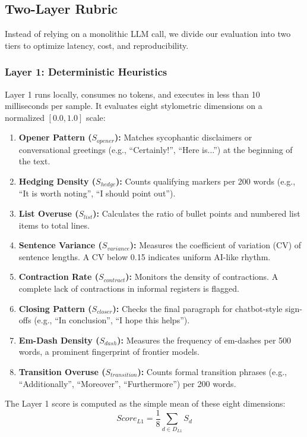 \documentclass{article}
\begin{document}
\subsection{Two-Layer Rubric}
Instead of relying on a monolithic LLM call, we divide our evaluation into two tiers to optimize latency, cost, and reproducibility.

\subsubsection{Layer 1: Deterministic Heuristics}
Layer 1 runs locally, consumes no tokens, and executes in less than 10 milliseconds per sample. It evaluates eight stylometric dimensions on a normalized $[0.0, 1.0]$ scale:
\begin{enumerate}
    \item \textbf{Opener Pattern ($S_{opener}$):} Matches sycophantic disclaimers or conversational greetings (e.g., ``Certainly!'', ``Here is...'') at the beginning of the text.
    \item \textbf{Hedging Density ($S_{hedge}$):} Counts qualifying markers per 200 words (e.g., ``It is worth noting'', ``I should point out'').
    \item \textbf{List Overuse ($S_{list}$):} Calculates the ratio of bullet points and numbered list items to total lines.
    \item \textbf{Sentence Variance ($S_{variance}$):} Measures the coefficient of variation (CV) of sentence lengths. A CV below 0.15 indicates uniform AI-like rhythm.
    \item \textbf{Contraction Rate ($S_{contract}$):} Monitors the density of contractions. A complete lack of contractions in informal registers is flagged.
    \item \textbf{Closing Pattern ($S_{closer}$):} Checks the final paragraph for chatbot-style sign-offs (e.g., ``In conclusion'', ``I hope this helps'').
    \item \textbf{Em-Dash Density ($S_{dash}$):} Measures the frequency of em-dashes per 500 words, a prominent fingerprint of frontier models.
    \item \textbf{Transition Overuse ($S_{transition}$):} Counts formal transition phrases (e.g., ``Additionally'', ``Moreover'', ``Furthermore'') per 200 words.
\end{enumerate}
The Layer 1 score is computed as the simple mean of these eight dimensions:
\begin{equation}
    Score_{L1} = \frac{1}{8} \sum_{d \in D_{L1}} S_d
\end{equation}
\end{document}
